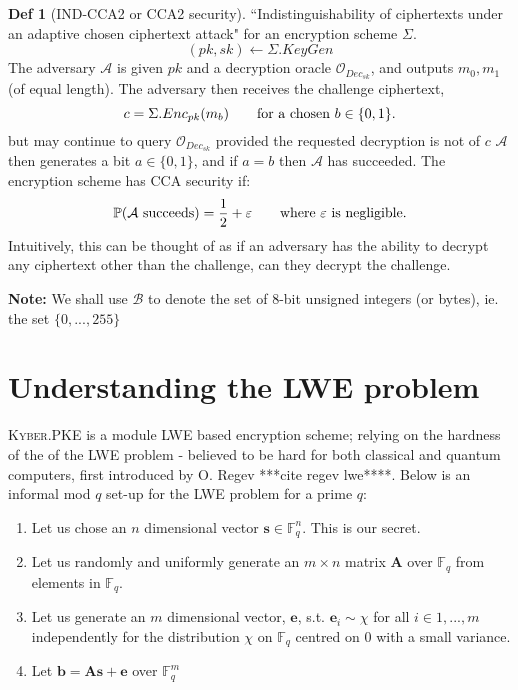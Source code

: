 \documentclass[a4paper, 10pt]{article}
\theoremstyle{definition}
\newtheorem{definition}{Def}[section]
\begin{document}
\begin{definition}[IND-CCA2 or CCA2 security]
    ``Indistinguishability of ciphertexts under an adaptive chosen ciphertext attack" for an encryption scheme $\Sigma $.\\
    \[(pk, sk) \leftarrow \Sigma.KeyGen \]
    The adversary $\mathcal{A} $ is given $pk$ and a decryption oracle $\mathcal{O}_{Dec_{sk}}$, and outputs $m_0, m_1$ (of equal length). The adversary then receives the challenge ciphertext,
    \[c=\Sigma .Enc_{pk}(m_b)\text{\qquad for a chosen }b \in \{ 0,1\}.\]
    but may continue to query $\mathcal{O}_{Dec_{sk}}$ provided the requested decryption is not of $c$
    $\mathcal{A} $ then generates a bit $a \in \{ 0, 1\}$, and if $a=b$ then $\mathcal{A} $ has succeeded.
    The encryption scheme has CCA security if:
    \[\mathbb{P} (\mathcal{A} \text{ succeeds}) = \frac{1}{2} + \varepsilon \text{\qquad where $\varepsilon$ is negligible.}\]
    Intuitively, this can be thought of as if an adversary has the ability to decrypt any ciphertext other than the challenge, can they decrypt the challenge.
\end{definition}

\textbf{Note:} We shall use $\mathcal{B} $ to denote the set of 8-bit unsigned integers (or bytes), ie. the set $\{0, ..., 255\}$



\newpage


\section{Understanding the LWE problem}

\textsc{Kyber}.\ac{PKE} is a module \ac{LWE} based encryption scheme; relying on the hardness of the of the \ac{LWE} problem -  believed to be hard for both classical and quantum computers, first introduced by O. Regev ***cite regev lwe****. Below is an informal mod $q$ set-up for the \ac{LWE} problem for a prime $q$:

\begin{enumerate}
    \item Let us chose an $n$ dimensional vector $\mathbf{s} \in \mathbb{F}^n_q$. This is our secret.
    \item Let us randomly and uniformly generate an $m\times n$ matrix $\mathbf{A} $ over $\mathbb{F}_q$ from elements in $\mathbb{F} _q$.
    \item Let us generate an $m$ dimensional vector, $\mathbf{e}$, s.t. $\mathbf{e}_i\sim \chi$ for all $i \in {1,...,m}$ independently for the distribution $\chi$ on $\mathbb{F}_q$ centred on $0$ with a small variance.
    \item Let $\mathbf{b} = \mathbf{A}\mathbf{s}+\mathbf{e}$ over $\mathbb{F}_q^m$
\end{enumerate}
\end{document}
